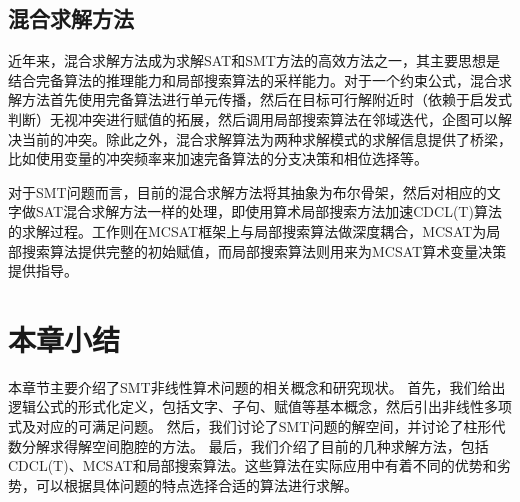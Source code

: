 \subsection{混合求解方法}
近年来，混合求解方法\cite{CaiZ21}成为求解SAT和SMT方法的高效方法之一，其主要思想是结合完备算法的推理能力和局部搜索算法的采样能力。对于一个约束公式，混合求解方法首先使用完备算法进行单元传播，然后在目标可行解附近时（依赖于启发式判断）无视冲突进行赋值的拓展，然后调用局部搜索算法在邻域迭代，企图可以解决当前的冲突。除此之外，混合求解算法为两种求解模式的求解信息提供了桥梁，比如使用变量的冲突频率来加速完备算法的分支决策和相位选择等。

对于SMT问题而言，目前的混合求解方法\cite{hybridSMT}将其抽象为布尔骨架，然后对相应的文字做SAT混合求解方法一样的处理，即使用算术局部搜索方法加速CDCL(T)算法的求解过程。工作\cite{BoostMcsat}则在MCSAT框架上与局部搜索算法做深度耦合，MCSAT为局部搜索算法提供完整的初始赋值，而局部搜索算法则用来为MCSAT算术变量决策提供指导。

\section{本章小结}

本章节主要介绍了SMT非线性算术问题的相关概念和研究现状。
首先，我们给出逻辑公式的形式化定义，包括文字、子句、赋值等基本概念，然后引出非线性多项式及对应的可满足问题。
然后，我们讨论了SMT问题的解空间，并讨论了柱形代数分解求得解空间胞腔的方法。
最后，我们介绍了目前的几种求解方法，包括CDCL(T)、MCSAT和局部搜索算法。这些算法在实际应用中有着不同的优势和劣势，可以根据具体问题的特点选择合适的算法进行求解。